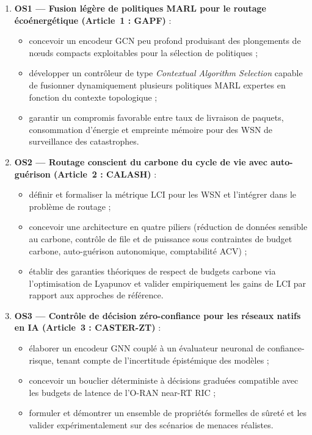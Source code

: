 \begin{enumerate}
  \item \textbf{OS1 — Fusion légère de politiques MARL pour le routage écoénergétique (Article~1 : GAPF)}\cite{gapf_tgcn2026,rashid2018qmix,son2019qtran,liu2024gnncomm,Nguyen2025GNNIoT} :
  \begin{itemize}
    \item concevoir un encodeur GCN peu profond produisant des plongements de nœuds compacts exploitables pour la sélection de politiques ;
    \item développer un contrôleur de type \emph{Contextual Algorithm Selection} capable de fusionner dynamiquement plusieurs politiques MARL expertes en fonction du contexte topologique ;
    \item garantir un compromis favorable entre taux de livraison de paquets, consommation d'énergie et empreinte mémoire pour des WSN de surveillance des catastrophes.
  \end{itemize}

  \item \textbf{OS2 — Routage conscient du carbone du cycle de vie avec auto-guérison (Article~2 : CALASH)}\cite{pirson2021embodied,aioti2024carbon,mersy2025lca_data,itu_ict2025} :
  \begin{itemize}
    \item définir et formaliser la métrique LCI pour les WSN et l'intégrer dans le problème de routage ;
    \item concevoir une architecture en quatre piliers (réduction de données sensible au carbone, contrôle de file et de puissance sous contraintes de budget carbone, auto-guérison autonomique, comptabilité ACV) ;
    \item établir des garanties théoriques de respect de budgets carbone via l'optimisation de Lyapunov et valider empiriquement les gains de LCI par rapport aux approches de référence.
  \end{itemize}

  \item \textbf{OS3 — Contrôle de décision zéro-confiance pour les réseaux natifs en IA (Article~3 : CASTER-ZT)}\cite{rose2020nist,garcia2015saferl,pranger2025shields,ztaiot_acm2025} :
  \begin{itemize}
    \item élaborer un encodeur GNN couplé à un évaluateur neuronal de confiance-risque, tenant compte de l'incertitude épistémique des modèles ;
    \item concevoir un bouclier déterministe à décisions graduées compatible avec les budgets de latence de l'O-RAN near-RT RIC ;
    \item formuler et démontrer un ensemble de propriétés formelles de sûreté et les valider expérimentalement sur des scénarios de menaces réalistes.
  \end{itemize}
\end{enumerate}

